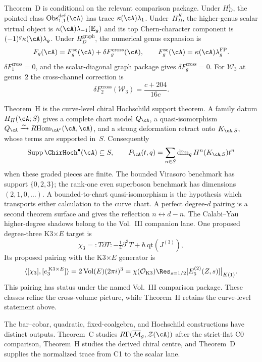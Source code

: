 Theorem~D is conditional on the relevant comparison package.  Under
$H_D^1$, the pointed class
$\operatorname{Obs}^{\mathrm{def}}_{1,1}(\cA)$ has trace
$\kappa(\cA)\lambda_1$.  Under~$H_D^K$, the higher-genus scalar
virtual object is
$\kappa(\cA)\lambda_{-1}(\mathbb E_g)$ and its top Chern-character
component is $(-1)^g\kappa(\cA)\lambda_g$.  Under
$H_D^{\mathrm{graph}}$, the numerical genus expansion is
\[
 F_g(\cA)=F_g^{\mathrm{sc}}(\cA)
 +\delta F_g^{\mathrm{cross}}(\cA),
 \qquad
 F_g^{\mathrm{sc}}(\cA)=\kappa(\cA)\lambda_g^{\mathrm{FP}}.
\]
$\delta F_1^{\mathrm{cross}}=0$, and the scalar-diagonal graph package
gives $\delta F_g^{\mathrm{cross}}=0$. For $\mathcal W_3$ at genus~$2$ the
cross-channel correction is
\[
 \delta F_2^{\mathrm{cross}}(\mathcal W_3)=\frac{c+204}{16c}.
\]

Theorem~H is the curve-level chiral Hochschild support theorem.  A
family datum $H_H(\cA;S)$ gives a complete chart model $Q_\cA$, a
quasi-isomorphism
$Q_\cA\xrightarrow{\sim}R\!\operatorname{Hom}_{\cA^e}(\cA,\cA)$,
and a strong deformation retract onto $K_{\cA,S}$, whose terms are
supported in~$S$.  Consequently
\[
 \operatorname{Supp}\ChirHoch^\bullet(\cA)\subseteq S,
 \qquad
 P_\cA(t,q)=\sum_{n\in S}\dim_qH^n(K_{\cA,S})t^n
\]
when these graded pieces are finite.  The bounded Virasoro benchmark
has support $\{0,2,3\}$; the rank-one even superboson benchmark has
dimensions $(2,1,0,\ldots)$.  A bounded-to-chart quasi-isomorphism is
the hypothesis which transports either calculation to the curve
chart.  A perfect degree-$d$ pairing is a second theorem surface and
gives the reflection $n\leftrightarrow d-n$.
The Calabi--Yau higher-degree shadows belong to the Vol.~III
companion lane.  One proposed degree-three K3$\times E$ target is
\[
 \chi_3={:}T\partial T{:}-\tfrac14\partial^3T
 +\hbar\,\mathrm{qt}(J^{(3)}),
\]
Its proposed pairing with the K3$\times E$ generator is
\[
 \langle[\chi_3],[e_3^{\,\mathrm{K3}\times E}]\rangle
 =2\,\mathrm{Vol}(E)(2\pi i)^3
 =\chi(\mathcal O_{\mathrm{K3}})
 \Res_{s=1/2}[E_5^{(2)}(Z,s)]\big|_{K(1)}.
\]
This pairing has status \ClaimStatusConjectured{} under the named
Vol.~III comparison package.  These classes refine the cross-volume
picture, while Theorem~H retains the curve-level statement above.

The bar--cobar, quadratic, fixed-coalgebra, and Hochschild constructions
have distinct outputs.  Theorem~C studies
$R\Gamma(\overline{\mathcal M}_g,\mathcal Z(\cA))$ after the strict-flat
C0 comparison, Theorem~H studies the derived chiral centre, and
Theorem~D supplies the normalized trace from C1 to the scalar lane.

